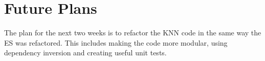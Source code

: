 \documentclass[]{article}
\begin{document}
	\section{Future Plans} \label{sec:plans}
		
	The plan for the next two weeks is to refactor the KNN code in the same way the ES was refactored. This includes making the code more modular, using dependency inversion and creating useful unit tests.
	
	
\end{document}
